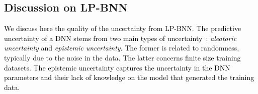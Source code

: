 \documentclass[10pt,twocolumn,letterpaper]{article}
\newcommand{\ab}[1]{\textcolor{black}{#1}}
\newcommand{\method}{LP-BNN\xspace}
\begin{document}
\begin{comment}
Recent efforts~\cite{fort2019deep,wilson2020bayesian} 
studied the weight modes 
computed by Deep Ensembles within BNNs, yet this line of research is computationally intractable at the scale required for \ab{practical} computer vision tasks. Dusenberry \etal~\cite{dusenberry2020efficient} propose 
a \ab{more} scalable solution for image classification, which is nonetheless prone to high instabilities due to the important number of parameters and to the fact that  and  are the latent variables of the variational distribution. In comparison, our 
approach requires less memory resources since we encode  in a lower dimensional space (we found empirically that a latent space of size \ab{only}  provides \ab{an appealing} compromise between accuracy and compactness). The only additional cost in terms of parameters and memory used 
\ab{w.r.t.} BE is related to the compact VAEs associated with each layer. 



\ab{Besides the lower number of parameters, LP-BNN training is more stable than for Rank-1 BNN due to the reconstruction term   which regularizes the 
loss in Eq.~\eqref{eq:loss-lpbnn} by controlling the variances of the sampled weights. BNNs usually need a range of heuristics, e.g. clipping, initialization from truncated Normal, extra weight regularization to stabilize training~\cite{dusenberry2020efficient}. For \method~training is overall straightforward even on complex and deep models, \eg DeepLabV3+, thanks to the VAE module that is stable.
}
\end{comment}

\subsection{Discussion on \method}



\ab{We discuss here the quality of the uncertainty from \method. The predictive uncertainty of a DNN stems from two main types of uncertainty~\cite{hora1996aleatory}: \emph{aleatoric uncertainty} and \emph{epistemic uncertainty}.}
The former is related to randomness, typically due to the noise in the data. The latter 
concerns 
\ab{finite size training datasets.}
\ab{The epistemic uncertainty captures the uncertainty in the DNN parameters and their lack of knowledge on the model that generated the training data.}
\end{document}
